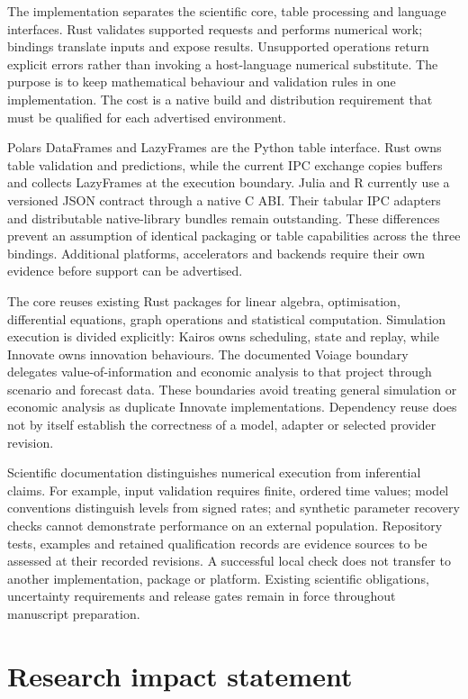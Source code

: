 \documentclass[10pt,a4paper,onecolumn]{article}
\begin{document}
The implementation separates the scientific core, table processing and
language interfaces. Rust validates supported requests and performs
numerical work; bindings translate inputs and expose results.
Unsupported operations return explicit errors rather than invoking a
host-language numerical substitute. The purpose is to keep mathematical
behaviour and validation rules in one implementation. The cost is a
native build and distribution requirement that must be qualified for
each advertised environment.

Polars DataFrames and LazyFrames are the Python table interface. Rust
owns table validation and predictions, while the current IPC exchange
copies buffers and collects LazyFrames at the execution boundary. Julia
and R currently use a versioned JSON contract through a native C ABI.
Their tabular IPC adapters and distributable native-library bundles
remain outstanding. These differences prevent an assumption of identical
packaging or table capabilities across the three bindings. Additional
platforms, accelerators and backends require their own evidence before
support can be advertised.

The core reuses existing Rust packages for linear algebra, optimisation,
differential equations, graph operations and statistical computation.
Simulation execution is divided explicitly: Kairos owns scheduling,
state and replay, while Innovate owns innovation behaviours. The
documented Voiage boundary delegates value-of-information and economic
analysis to that project through scenario and forecast data. These
boundaries avoid treating general simulation or economic analysis as
duplicate Innovate implementations. Dependency reuse does not by itself
establish the correctness of a model, adapter or selected provider
revision.

Scientific documentation distinguishes numerical execution from
inferential claims. For example, input validation requires finite,
ordered time values; model conventions distinguish levels from signed
rates; and synthetic parameter recovery checks cannot demonstrate
performance on an external population. Repository tests, examples and
retained qualification records are evidence sources to be assessed at
their recorded revisions. A successful local check does not transfer to
another implementation, package or platform. Existing scientific
obligations, uncertainty requirements and release gates remain in force
throughout manuscript preparation.

\section{Research impact statement}\label{research-impact-statement}
\end{document}
